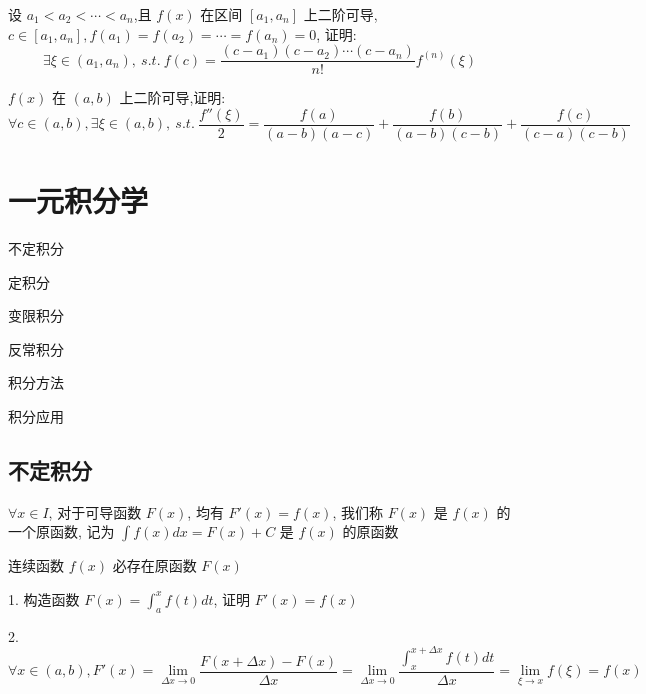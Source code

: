 \begin{proposition}
	设 $a_{1}<a_{2}<\cdots<a_{n}$,且 $f(x)$ 在区间 $[a_{1},a_{n}]$ 上二阶可导,
	$c\in[a_{1},a_{n}],f(a_{1})=f(a_{2})=\cdots=f(a_{n})=0$,
	证明: $$\exists \xi\in(a_{1},a_{n}),\ s.t.\ f(c)=\dfrac{(c-a_{1})(c-a_{2})\cdots(c-a_{n})}{n!}f^{(n)}(\xi)$$
\end{proposition}
\begin{solution}

\end{solution}


\begin{proposition}
	$f(x)$ 在 $(a,b)$ 上二阶可导,证明:
	$$\forall c\in(a,b),\exists\xi\in(a,b),\ s.t.\ \dfrac{f''(\xi)}{2}=\dfrac{f(a)}{(a-b)(a-c)}+\dfrac{f(b)}{(a-b)(c-b)}+\dfrac{f(c)}{(c-a)(c-b)}$$
\end{proposition}
\begin{solution}

\end{solution}


\chapter{一元积分学}
\begin{introduction}
	\item 不定积分
	\item 定积分
	\item 变限积分
	\item 反常积分
	\item 积分方法
	\item 积分应用
\end{introduction}
\section{不定积分}
\begin{definition}[不定积分]
	$\forall x\in I$, 对于可导函数 $F(x)$, 均有 $F'(x) = f(x)$, 我们称 $F(x)$ 是 $f(x)$ 的一个原函数, 记为 $\int f(x)dx = F(x) + C$ 是 $f(x)$ 的原函数
\end{definition}

\begin{theorem}
	连续函数 $f(x)$ 必存在原函数 $F(x)$
	\begin{anymark}[证明]
		1. 构造函数 $F(x) = \int_{a}^{x}f(t)dt$, 证明 $F'(x) = f(x)$
		
		2. $\forall x\in(a,b), F'(x) = \lim\limits_{\Delta x\to 0}\dfrac{F(x+\Delta x)-F(x)}{\Delta x} = \lim\limits_{\Delta x\to 0}\dfrac{\int_{x}^{x+\Delta x}f(t)dt}{\Delta x} = \lim\limits_{\xi\to x}f(\xi) = f(x)$
	\end{anymark}
\end{theorem}

